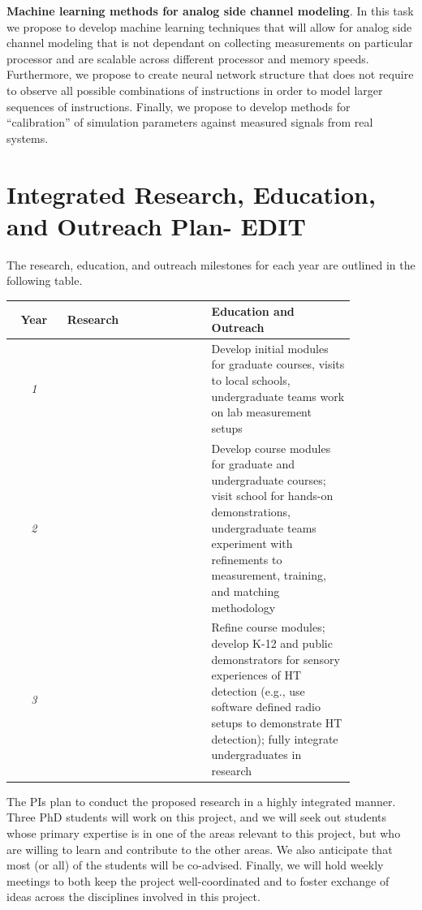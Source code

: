 \documentclass[11 pt]{article}
\begin{document}
\textbf{Machine learning methods for analog side channel modeling}. In this task we propose to develop machine learning techniques that will allow for analog side channel modeling that is not dependant on collecting measurements on particular processor and are scalable across different processor and memory speeds. Furthermore, we propose to create neural network structure that does not require to observe all possible combinations of instructions in order to model larger sequences of instructions. Finally, we propose to develop methods for ``calibration'' of simulation parameters against measured signals from real systems.






\section{Integrated Research, Education, and Outreach Plan- EDIT}
The research, education, and outreach milestones for each year are outlined in the following table.
\begin{small}
\begin{tabular}{||c|p{0.42\linewidth}|p{0.42\linewidth}||}
\hline
\hline
\textbf{Year} & \textbf{Research} & \textbf{Education and Outreach}\\
\hline
\textit{1} &
  &
Develop initial modules for graduate courses, visits to local schools, undergraduate teams work on lab measurement setups\\
\hline
\textit{2} &
&
Develop course modules for graduate and undergraduate courses; visit school for hands-on demonstrations, undergraduate teams experiment with refinements to measurement, training, and matching methodology \\
\hline
\textit{3}  & 
 &
Refine course modules; develop K-12 and public demonstrators for sensory experiences of HT detection (e.g., use software defined radio setups to demonstrate HT detection); fully integrate undergraduates in research\\
\hline
\hline
\end{tabular}
\end{small}

The PIs plan to conduct the proposed research in a highly integrated manner.
Three PhD students will work on this project, and we will seek out students
whose primary expertise is in one of the areas relevant to this project,
but who are willing to learn and contribute to the other areas. We also
anticipate that most (or all) of the students will be co-advised. Finally,
we will hold weekly meetings to both keep the project well-coordinated and
to foster exchange of ideas across the disciplines involved in this project.
\end{document}

